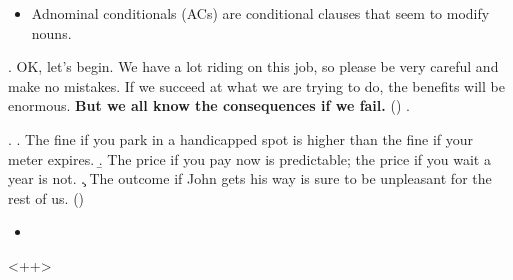 \documentclass[letterpaper,12pt]{article}
\begin{document}
\begin{itemize}
  \item Adnominal conditionals (ACs) are conditional clauses that seem to modify nouns.
\end{itemize}
\ex. OK, let's begin.
We have a lot riding on this job, so please be very careful and make no mistakes.
If we succeed at what we are trying to do, the benefits will be enormous.
\textbf{But we all know the consequences if we fail.} \hfill (\cite{lasersohn1996adnominal})
\z.

\ex.
\a. The fine if you park in a handicapped spot is higher than the fine if your
meter expires.
\b. The price if you pay now is predictable; the price if you wait a year is not.
\c. The outcome if John gets his way is sure to be unpleasant for the rest of
us. \hfill (\cite{lasersohn1996adnominal})
\begin{itemize}
  \item 
\end{itemize}<++>
\end{document}
